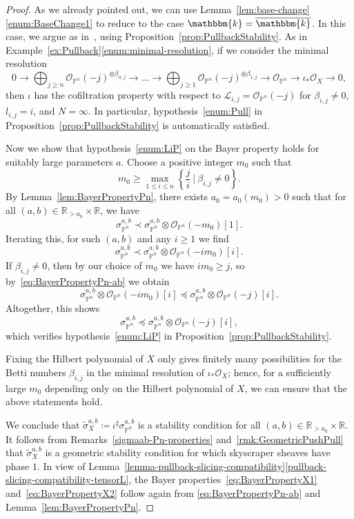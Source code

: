 \documentclass[11pt, reqno]{amsart}
\numberwithin{equation}{section}
\theoremstyle{plain}
\theoremstyle{remark}
\theoremstyle{definition}
\theoremstyle{italicsname}
\newcommand{\cO}{\mathcal{O}}
\newcommand{\cL}{\mathcal{L}}
\newcommand{\KK}{\mathbbm{k}}
\def\RR{\ensuremath{\mathbb{R}}}
\def\PP{\ensuremath{\mathbb{P}}}
\begin{document}
\begin{proof}
As we already pointed out, we can use Lemma~\ref{lem:base-change}\ref{enum:BaseChange1} to reduce to the case $\KK=\overline{\KK}$.
In this case, we argue as in~\cite[Theorem 6.5]{chunyi-stability}, using Proposition~\ref{prop:PullbackStability}. 
As in Example~\ref{ex:Pullback}\eqref{enum:minimal-resolution}, if we consider the minimal resolution  
\[
0\longrightarrow \bigoplus_{j \geq n} \cO_{\PP^n}(-j)^{\oplus \beta_{n,j}}\longrightarrow\dots\longrightarrow\bigoplus_{j\geq 1} \cO_{\PP^n}(-j)^{\oplus \beta_{1,j}}\longrightarrow\cO_{\PP^n}\longrightarrow\iota_*\cO_X\longrightarrow 0, 
\]
then $\iota$ has the cofiltration property with respect to $\cL_{i,j} = \cO_{\PP^n}(-j)$ for $\beta_{i,j} \neq 0$, $l_{i,j} = i$, and $N = \infty$.
In particular, hypothesis~\ref{enum:Pull} in Proposition~\ref{prop:PullbackStability} is automatically satisfied. 

Now we show that hypothesis~\ref{enum:LiP} on the Bayer property holds for suitably large parameters $a$.  
Choose a positive integer $m_0$ such that
\[
m_0\geq\max_{1\leq i \leq n}\left\{\frac{j}{i}~\Bigg|~\beta_{i,j}\neq 0\right\}.
\]
By Lemma~\ref{lem:BayerPropertyPn}, there exists $a_0=a_0(m_0)>0$ such that for
all $(a,b)\in\RR_{>a_0}\times\RR$, we have
\[
\sigma_{\PP^n}^{a,b}\prec\sigma_{\PP^n}^{a,b}\otimes\cO_{\PP^n}(-m_0)[1].
\]
Iterating this, for such $(a,b)$ and any $i \geq 1$ we find 
\begin{equation*}
    \sigma_{\PP^n}^{a,b} \prec \sigma_{\PP^n}^{a,b}\otimes\cO_{\PP^n}(-im_0)[i]. 
\end{equation*}
If $\beta_{i,j} \neq 0$, then by our choice of $m_0$ we have $im_0 \geq j$, so by~\eqref{eq:BayerPropertyPn-ab} we obtain  
\begin{equation*}
\sigma_{\PP^n}^{a,b}\otimes\cO_{\PP^n}(-im_0)[i] \preceq 
\sigma_{\PP^n}^{a,b}\otimes\cO_{\PP^n}(-j)[i]. 
\end{equation*} 
Altogether, this shows
\begin{equation*}
\sigma_{\PP^n}^{a,b} \preceq 
\sigma_{\PP^n}^{a,b}\otimes\cO_{\PP^n}(-j)[i], 
\end{equation*}
which verifies hypothesis~\ref{enum:LiP} in Proposition~\ref{prop:PullbackStability}. 

Fixing the Hilbert polynomial of $X$ only gives finitely many possibilities for the Betti numbers $\beta_{i,j}$ in the minimal resolution of $\iota_*\cO_X$; hence, for a sufficiently large $m_0$ depending only on the Hilbert polynomial of $X$, we can ensure that the above statements hold. 

We conclude that $\widetilde{\sigma}_X^{a,b} \coloneqq\iota^\sharp\sigma^{a,b}_{\PP^n}$ is a stability condition for all $(a,b) \in \RR_{>a_0} \times \RR$.
It follows from Remarks~\ref{sigmaab-Pn-properties} and~\ref{rmk:GeometricPushPull} that $\widetilde{\sigma}_X^{a,b}$ is a geometric stability condition for which skyscraper sheaves have phase $1$.  
In view of Lemma~\ref{lemma-pullback-slicing-compatibility}\ref{pullback-slicing-compatibility-tensorL}, the Bayer properties~\eqref{eq:BayerPropertyX1} and~\eqref{eq:BayerPropertyX2} follow again from \eqref{eq:BayerPropertyPn-ab} and Lemma~\ref{lem:BayerPropertyPn}.
\end{proof}
\end{document}
